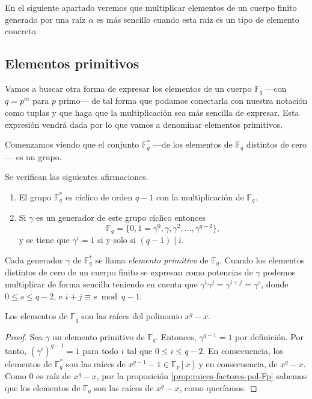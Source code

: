 En el siguiente apartado veremos que multiplicar elementos de un cuerpo finito generado por una raíz \(\alpha\) es más sencillo cuando esta raíz es un tipo de elemento concreto.

\subsection{Elementos primitivos}

Vamos a buscar otra forma de expresar los elementos de un cuerpo \(\mathbb F_q\) —con \(q = p^m\) para \(p\) primo— de tal forma que podamos conectarla con nuestra notación como tuplas y que haga que la multiplicación sea más sencilla de expresar.
Esta expresión vendrá dada por lo que vamos a denominar elementos primitivos.

Comenzamos viendo que el conjunto \(\mathbb F_q^*\) —de los elementos de \(\mathbb F_q\) distintos de cero— es un grupo.

\begin{theorem}
  \label{th:Fq-ast-cilcico}
  Se verifican las siguientes afirmaciones.
  \begin{enumerate}
    \item El grupo \(\mathbb F_q^*\) es cíclico de orden \(q - 1\) con la multiplicación de \(\mathbb F_q\).
    \item Si \(\gamma\) es un generador de este grupo cíclico entonces
    \[
      \mathbb F_q = \{0, 1 = \gamma^0, \gamma, \gamma^2, \dots, \gamma^{q-2}\},
    \] y se tiene que \(\gamma^i = 1\) si y solo si \((q-1) \mid i\).
  \end{enumerate}
\end{theorem}

Cada generador \(\gamma\) de \(\mathbb F_q^*\) se llama \textit{elemento primitivo} de \(\mathbb F_q\).
Cuando los elementos distintos de cero de un cuerpo finito se expresan como potencias de \(\gamma\) podemos multiplicar de forma sencilla teniendo en cuenta que \(\gamma^i\gamma^j = \gamma^{i+j} = \gamma^s\), donde \(0 \leq s \leq q-2\), e \(i + j \equiv s \bmod q - 1\).

\begin{theorem}
  \label{th:el-Fq-raices-pol}
  Los elementos de \(\mathbb F_q\) son las raíces del polinomio \(x^q - x\).
\end{theorem}

\begin{proof}
  Sea \(\gamma\) un elemento primitivo de \(\mathbb F_q\).
  Entonces, \(\gamma^{q-1} = 1\) por definición.
  Por tanto, \((\gamma^i)^{q-1} = 1\) para todo \(i\) tal que \(0 \leq i \leq q - 2\).
  En consecuencia, los elementos de \(\mathbb F_q^*\) son las raíces de \(x^{q-1}-1 \in \mathbb F_p[x]\) y en consecuencia, de \(x^q - x\).
  Como \(0\) es raíz de \(x^q - x\), por la proposición \ref{prop:raices-factores-pol-Fp} sabemos que los elementos de \(\mathbb F_q\) son las raíces de \(x^q - x\), como queríamos.
\end{proof}

